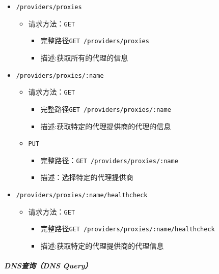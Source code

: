 \begin{itemize}
    \item \verb|/providers/proxies|
    \begin{itemize}
        \item 请求方法：\verb|GET|
        \begin{itemize}
            \item 完整路径\verb|GET /providers/proxies|
            \item 描述:获取所有的代理的信息
        \end{itemize}
    \end{itemize}
    \item \verb|/providers/proxies/:name|
    \begin{itemize}
        \item 请求方法：\verb|GET|
        \begin{itemize}
            \item 完整路径\verb|GET /providers/proxies/:name|
            \item 描述:获取特定的代理提供商的代理的信息
        \end{itemize}
        \item \verb|PUT|
        \begin{itemize}
            \item 完整路径：\verb|GET /providers/proxies/:name|
            \item 描述：选择特定的代理提供商
        \end{itemize}
    \end{itemize}
    \item \verb|/providers/proxies/:name/healthcheck|
    \begin{itemize}
        \item 请求方法：\verb|GET|
        \begin{itemize}
            \item 完整路径\verb|GET /providers/proxies/:name/healthcheck|
            \item 描述:获取特定的代理提供商的代理信息
        \end{itemize}
    \end{itemize}
\end{itemize}

\subparagraph{DNS查询（DNS Query）}

